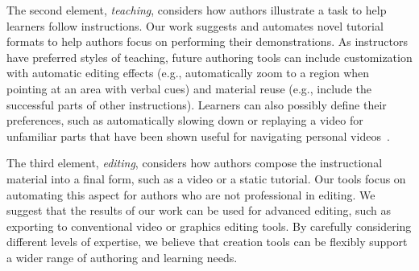 The second element, \emph{teaching}, considers how authors illustrate a task to help learners follow instructions. Our work suggests and automates novel tutorial formats to help authors focus on performing their demonstrations. As instructors have preferred styles of teaching, future authoring tools can include customization with automatic editing effects (e.g., automatically zoom to a region when pointing at an area with verbal cues) and material reuse (e.g., include the successful parts of other instructions). Learners can also possibly define their preferences, such as automatically slowing down or replaying a video for unfamiliar parts that have been shown useful for navigating personal videos~\cite{Cheng:2009:SUV:1518701.1518823}.

The third element, \emph{editing}, considers how authors compose the instructional material into a final form, such as a video or a static tutorial. Our tools focus on automating this aspect for authors who are not professional in editing. We suggest that the results of our work can be used for advanced editing, such as exporting to conventional video or graphics editing tools.
%
By carefully considering different levels of expertise, we believe that creation tools can be flexibly support a wider range of authoring and learning needs.

